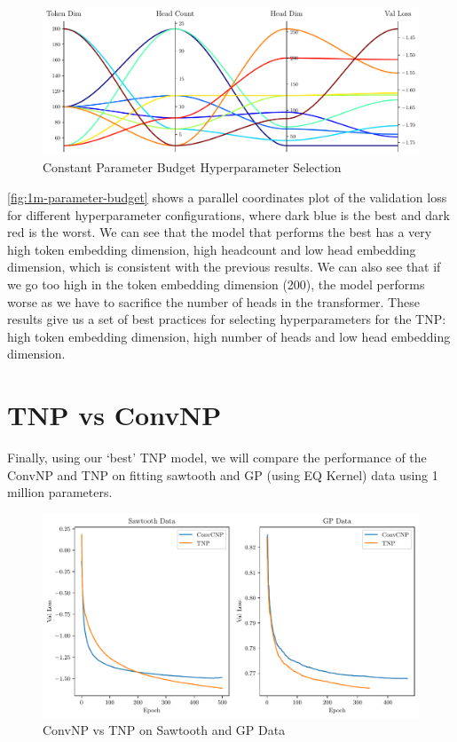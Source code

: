 \documentclass[../../main.tex]{subfiles}
\begin{document}

\FloatBarrier
\begin{figure}[ht!]
	\centering
	\includegraphics[width=0.9\linewidth]{./model-comparsion-1d.pdf}
	\caption{Constant Parameter Budget Hyperparameter Selection}
	\label{fig:1m-parameter-budget}
\end{figure}
\FloatBarrier

\autoref{fig:1m-parameter-budget} shows a parallel coordinates plot of the validation loss for different hyperparameter configurations, where dark blue is the best and dark red is the worst. We can see that the model that performs the best has a very high token embedding dimension, high headcount and low head embedding dimension, which is consistent with the previous results. We can also see that if we go too high in the token embedding dimension (200), the model performs worse as we have to sacrifice the number of heads in the transformer. These results give us a set of best practices for selecting hyperparameters for the TNP: high token embedding dimension, high number of heads and low head embedding dimension.





\section{TNP vs ConvNP}


Finally, using our `best' TNP model, we will compare the performance of the ConvNP and TNP on fitting sawtooth and GP (using EQ Kernel) data using 1 million parameters. 


\begin{figure}[H]
	\centering
	\includegraphics[width=0.5\linewidth]{./convcnp-vs-tetnp-saw-gp.pdf}
	\caption{ConvNP vs TNP on Sawtooth and GP Data}
	\label{fig:conv-tnp-1d-result}
\end{figure}
\end{document}
